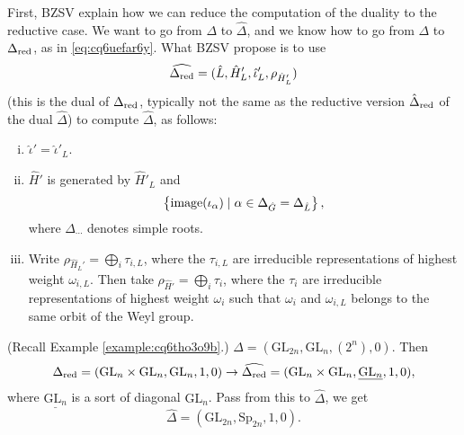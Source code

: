 \documentclass[reqno]{amsart} 
\numberwithin{theorem}{section}
\numberwithin{equation}{section}
\numberwithin{exercise}{section}
\begin{document}
First, BZSV explain how we can reduce the computation of the duality to the reductive case.  We want to go from $\Delta$ to $\hat{\Delta}$, and we know how to go from $\Delta$ to $\Delta_{\operatorname{red}}$, as in \eqref{eq:cq6uefar6y}.  What BZSV propose is to use
\begin{equation*}
  \widehat{\Delta_{\operatorname{red}}} =(\hat{L}, \hat{H}_{L}', \hat{\iota}_L ', \rho_{\hat{H}_{L}'})
\end{equation*}
(this is the dual of $\Delta_{\operatorname{red}}$, typically not the same as the reductive version $\hat{\Delta}_{\operatorname{red}}$ of the dual $\hat{\Delta}$) to compute $\hat{\Delta}$, as follows:
\begin{enumerate}[(i)]
\item $\hat{\iota}' = \hat{\iota}'_L $.
\item $\hat{H}'$ is generated by $\hat{H}'_L$ and
  \begin{equation*}
    \left\{ \operatorname{image}(\iota_\alpha) \mid \alpha \in \Delta_{\hat{G}} = \Delta_{\hat{L}} \right\},
  \end{equation*}
  where $\Delta_{\dotsb}$ denotes simple roots.
\item Write $\rho_{\hat{H}_L '} = \bigoplus_i \tau_{i, L}$, where the $\tau_{i, L}$ are irreducible representations of highest weight $\omega_{i,L}$.  Then take $\rho_{\hat{H}'} = \bigoplus_i \tau_i$, where the $\tau_i$ are irreducible representations of highest weight $\omega_i$ such that $\omega_i$ and $\omega_{i, L}$ belongs to the same orbit of the Weyl group.
\end{enumerate}
\begin{example}
  (Recall Example \ref{example:cq6tho3o9b}.)  $\Delta =(\mathrm{GL}_{2 n},\mathrm{GL}_{n},(2^n), 0)$.  Then
  \begin{equation*}
    \Delta_{\operatorname{red}} =(\mathrm{GL}_n \times \mathrm{GL}_n, \mathrm{GL}_n, 1, 0)
    \rightarrow
    \widehat{\Delta_{\operatorname{red}}}
    =(\mathrm{GL}_n \times \mathrm{GL}_n, \underline{\mathrm{GL}_n}, 1, 0),
  \end{equation*}
  where $\underline{\mathrm{GL}_n}$ is a sort of diagonal $\mathrm{GL}_n$.  Pass from this to $\hat{\Delta}$, we get
  \begin{equation*}
    \hat{\Delta} =(\mathrm{GL}_{2 n},\mathrm{Sp}_{2 n}, 1, 0).
  \end{equation*}
\end{example}
\end{document}
